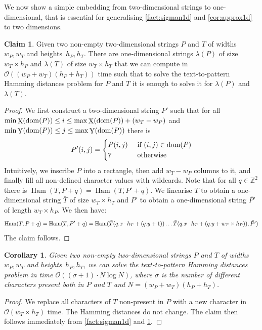 \documentclass[11pt, letterpaper]{article}
\theoremstyle{plain}
\newtheorem{corollary}[fact]{Corollary}
\theoremstyle{definition}
\newtheorem{claim}{Claim}
\theoremstyle{remark}
\newcommand{\Z}{\mathbb{Z}}
\renewcommand{\O}{\mathcal{O}}
\DeclareMathOperator*{\X}{X}
\DeclareMathOperator*{\Y}{Y}
\DeclareMathOperator*{\Ham}{Ham}
\begin{document}
We now show a simple embedding from two-dimensional strings to one-dimensional, that is essential for generalising \cref{fact:sigman1d} and \cref{cor:approx1d} to two dimensions.

\begin{claim}
\label{claim:padding}
Given two non-empty two-dimensional strings $P$ and $T$ of widths $w_P, w_T$ and heights~$h_P, h_T$. There are one-dimensional strings $\lambda(P)$ of size $w_T \times h_P$ and $\lambda(T)$ of size $w_T \times h_T$ that we can compute in $\O((w_P+w_T)(h_P+h_T))$ time such that to solve the text-to-pattern Hamming distances problem for $P$ and $T$ it is enough to solve it for $\lambda(P)$ and $\lambda(T)$. 
\end{claim}
\begin{proof}
We first construct a two-dimensional string $P'$ such that for all $\min \X(\d{P}) \le i \le \max \X(\d{P})+(w_T-w_P)$ and $\min \Y(\d{P}) \le j \le \max \Y(\d{P})$ there is
%
$$
P'(i,j) = 
\begin{cases}
P(i,j) & \text{ if } (i,j) \in \operatorname*{dom}(P)\\
\texttt{?} & \text{ otherwise}
\end{cases}
$$
%
Intuitively, we inscribe $P$ into a rectangle, then add $w_T-w_P$ columns to it, and finally fill all non-defined character values with wildcards. Note that for all $q \in \Z^2$ there is $\Ham(T,P+q) = \Ham(T,P'+q)$. We linearise $T$ to obtain a one-dimensional string $\bar{T}$ of size $w_T \times h_T$ and $P'$ to obtain a one-dimensional string $\bar{P'}$ of length $w_T \times h_P$. We then have:
%
$$\Ham(T, P+q) = \Ham(T,P'+q) = \Ham(\bar{T}(\x{q} \cdot h_T + (\y{q}+1)) \ldots \bar{T}(\x{q} \cdot h_T + (\y{q}+w_T \times h_P)), \bar{P'})$$
%
The claim follows. 
\end{proof}

\begin{corollary}\label{cor:sigman2d}
Given two non-empty two-dimensional strings $P$ and $T$ of widths $w_P, w_T$ and heights~$h_P, h_T$, we can solve the text-to-pattern Hamming distances problem in time $\O((\sigma+1) \cdot N \log N)$, where $\sigma$ is the number of different characters present both in $P$ and $T$ and $N = (w_P + w_T)(h_P + h_T)$.
\end{corollary}
\begin{proof}
We replace all characters of $T$ non-present in $P$ with a new character in $\O(w_T\times h_T)$ time. The Hamming distances do not change. The claim then follows immediately from \cref{fact:sigman1d} and \cref{claim:padding}. 
\end{proof}
\end{document}
